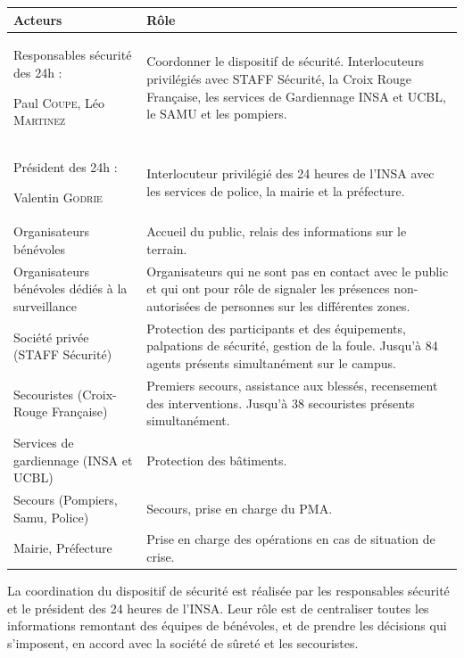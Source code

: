 \documentclass[hidelinks, paper=a4, fontsize=13pt]{report}
\begin{document}
\begin{center}
	\begin{tabular}{ | p{6cm} | p{10cm} | }
		\hline
		\cellcolor[gray]{0.9}
		Acteurs & \cellcolor[gray]{0.9} Rôle \\ \hline
		Responsables sécurité des 24h :
		
		Paul \textsc{Coupe}, \newline
		Léo \textsc{Martinez} & Coordonner le dispositif de sécurité. Interlocuteurs privilégiés avec STAFF Sécurité, la Croix Rouge Française, les services de Gardiennage INSA et UCBL, le SAMU et les  pompiers. \\ \hline
		Président des 24h :
		
		Valentin \textsc{Godrie} & Interlocuteur privilégié des 24 heures de l'INSA avec les services de police, la mairie et la préfecture. \\ \hline
		Organisateurs
		bénévoles & Accueil du public, relais des informations sur le terrain. \\ \hline
		Organisateurs bénévoles dédiés à la surveillance & Organisateurs qui ne sont pas en contact avec le public et qui ont pour rôle de signaler les présences non-autorisées de personnes sur les différentes zones. \\ \hline
		Société privée (STAFF Sécurité) & Protection des participants et des équipements, palpations de sécurité, gestion de la foule.
		Jusqu’à 84 agents présents simultanément sur le campus. \\ \hline
		Secouristes (Croix-Rouge Française) & Premiers secours, assistance aux blessés, recensement des interventions.
		Jusqu’à 38 secouristes présents simultanément. \\ \hline
		Services de gardiennage
		(INSA et UCBL) & Protection des bâtiments. \\ \hline
		Secours
		(Pompiers, Samu, Police) & Secours, prise en charge du PMA. \\ \hline
		Mairie, Préfecture & Prise en charge des opérations en cas de situation de crise. \\ \hline
	\end{tabular}
\end{center}

La coordination du dispositif de sécurité est réalisée par les responsables sécurité et le président des 24 heures de l’INSA. Leur rôle est de centraliser toutes les informations remontant des équipes de bénévoles, et de prendre les décisions qui s’imposent, en accord avec la société de sûreté et les secouristes.\\
\end{document}
